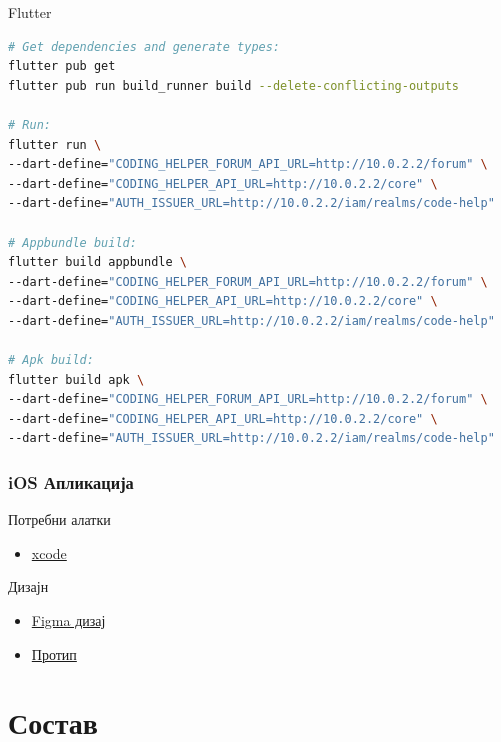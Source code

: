 \documentclass{article}
\begin{document}
Flutter
\begin{lstlisting}[language=sh]
# Get dependencies and generate types:
flutter pub get
flutter pub run build_runner build --delete-conflicting-outputs

# Run:
flutter run \
--dart-define="CODING_HELPER_FORUM_API_URL=http://10.0.2.2/forum" \
--dart-define="CODING_HELPER_API_URL=http://10.0.2.2/core" \
--dart-define="AUTH_ISSUER_URL=http://10.0.2.2/iam/realms/code-help"

# Appbundle build:
flutter build appbundle \
--dart-define="CODING_HELPER_FORUM_API_URL=http://10.0.2.2/forum" \
--dart-define="CODING_HELPER_API_URL=http://10.0.2.2/core" \
--dart-define="AUTH_ISSUER_URL=http://10.0.2.2/iam/realms/code-help"

# Apk build:
flutter build apk \
--dart-define="CODING_HELPER_FORUM_API_URL=http://10.0.2.2/forum" \
--dart-define="CODING_HELPER_API_URL=http://10.0.2.2/core" \
--dart-define="AUTH_ISSUER_URL=http://10.0.2.2/iam/realms/code-help"
\end{lstlisting}

\subsubsection{iOS Апликација}

Потребни алатки\begin{itemize}
\item \href{https://developer.apple.com/xcode/) (mac only}{xcode}
\end{itemize}
Дизајн\begin{itemize}
\item \href{https://www.figma.com/design/jPnnbfNqoAwo7Cn1DNMH5M/Coding-helper?node-id=0-1&t=seXueaDKHNTkP7DZ-0}{Figma дизај}
\item \href{https://www.figma.com/proto/jPnnbfNqoAwo7Cn1DNMH5M/Coding-helper?node-id=0%3A1&t=Ov7dI0u7oWTtRXqm-1}{Протип}
\end{itemize}

\section{Состав}
\end{document}
